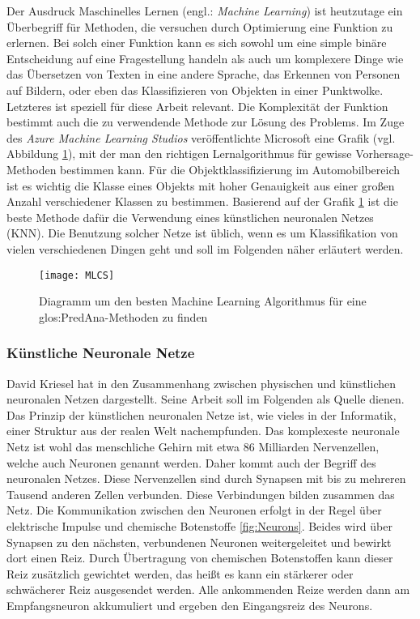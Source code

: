 Der Ausdruck Maschinelles Lernen (engl.: \textit{Machine Learning}) ist heutzutage ein Überbegriff für Methoden, die versuchen durch Optimierung eine Funktion zu erlernen. Bei solch einer Funktion kann es sich sowohl um eine simple binäre Entscheidung auf eine Fragestellung handeln als auch um komplexere Dinge wie das Übersetzen von Texten in eine andere Sprache, das Erkennen von Personen auf Bildern, oder eben das Klassifizieren von Objekten in einer Punktwolke. Letzteres ist speziell für diese Arbeit relevant. Die Komplexität der Funktion bestimmt auch die zu verwendende Methode zur Lösung des Problems. Im Zuge des \textit{Azure Machine Learning Studios} veröffentlichte Microsoft eine Grafik (vgl. Abbildung \ref{fig:MLCS}), mit der man den richtigen Lernalgorithmus für gewisse Vorhersage-Methoden bestimmen kann. Für die Objektklassifizierung im Automobilbereich ist es wichtig die Klasse eines Objekts mit hoher Genauigkeit aus einer großen Anzahl verschiedener Klassen zu bestimmen. Basierend auf der Grafik \ref{fig:MLCS} ist die beste Methode dafür die Verwendung eines künstlichen neuronalen Netzes (KNN). Die Benutzung solcher Netze ist üblich, wenn es um Klassifikation von vielen verschiedenen Dingen geht und soll im Folgenden näher erläutert werden.\\

\begin{figure}%
	\centering
    \texttt{[image: MLCS]}
    \caption{Diagramm um den besten Machine Learning Algorithmus für eine \gls{glos:PredAna}-Methoden zu finden \cite{bib:AzureCs}}
    \label{fig:MLCS}
\end{figure}
  
\subsubsection{Künstliche Neuronale Netze}
\label{sec:KNN}
David Kriesel hat in \cite{bib:UebereblickNN} den Zusammenhang zwischen physischen und künstlichen neuronalen Netzen dargestellt. Seine Arbeit soll im Folgenden als Quelle dienen. Das Prinzip der künstlichen neuronalen Netze ist, wie vieles in der Informatik, einer Struktur aus der realen Welt nachempfunden. Das komplexeste neuronale Netz ist wohl das menschliche Gehirn mit etwa 86 Milliarden Nervenzellen, welche auch Neuronen genannt werden. Daher kommt auch der Begriff des neuronalen Netzes. Diese Nervenzellen sind durch Synapsen mit bis zu mehreren Tausend anderen Zellen verbunden. Diese Verbindungen bilden zusammen das Netz. Die Kommunikation zwischen den Neuronen erfolgt in der Regel über elektrische Impulse und chemische Botenstoffe \ref{fig:Neurons}. Beides wird über Synapsen zu den nächsten, verbundenen Neuronen weitergeleitet und bewirkt dort einen Reiz. Durch Übertragung von chemischen Botenstoffen kann dieser Reiz zusätzlich gewichtet werden, das heißt es kann ein stärkerer oder schwächerer Reiz ausgesendet werden. Alle ankommenden Reize werden dann am Empfangsneuron akkumuliert und ergeben den Eingangsreiz des Neurons.\\ 

